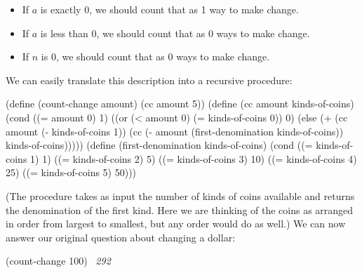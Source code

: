 \begin{itemize}
\item
If \( a \) is exactly 0, we should count that as 1 way to make change.

\item
If \( a \) is less than 0, we should count that as 0 ways to make change.

\item
If \( n \) is 0, we should count that as 0 ways to make change.
\end{itemize}

\noindent
We can easily translate this description into a recursive procedure:

\begin{codeBlock}
(define (count-change amount) (cc amount 5))
(define (cc amount kinds-of-coins)
  (cond ((= amount 0) 1)
        ((or (< amount 0) (= kinds-of-coins 0)) 0)
        (else (+ (cc amount
                     (- kinds-of-coins 1))
                 (cc (- amount
                        (first-denomination
                         kinds-of-coins))
                     kinds-of-coins)))))
(define (first-denomination kinds-of-coins)
  (cond ((= kinds-of-coins 1) 1)
        ((= kinds-of-coins 2) 5)
        ((= kinds-of-coins 3) 10)
        ((= kinds-of-coins 4) 25)
        ((= kinds-of-coins 5) 50)))
\end{codeBlock}

\noindent
(The  procedure takes as input the number of kinds of
coins available and returns the denomination of the first kind.  Here we are
thinking of the coins as arranged in order from largest to smallest, but any
order would do as well.)  We can now answer our original question about
changing a dollar:

\begin{codeBlock}
(count-change 100)
~\textit{292}~
\end{codeBlock}

